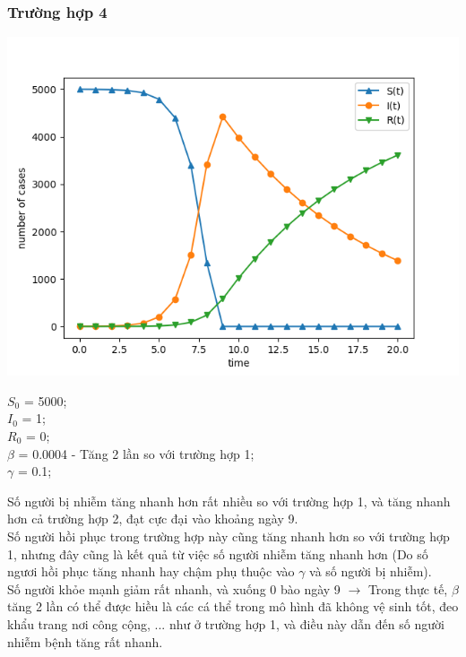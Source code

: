 \documentclass[a4paper]{article}
\begin{document}
\subsubsection{Trường hợp 4}
\begin{center}
\includegraphics{Images/5000 1 0 0_0004 0_1.png}
\end{center}
\begin{flushleft}
$S_0$ = 5000;\\
$I_0$ = 1;\\
$R_0$ = 0;\\
$\beta$ = 0.0004 - Tăng 2 lần so với trường hợp 1;\\
$\gamma$ = 0.1;\\
\end{flushleft}
Số người bị nhiễm tăng nhanh hơn rất nhiều so với trường hợp 1, và tăng nhanh hơn cả trường hợp 2, đạt cực đại vào khoảng ngày 9.\\
Số người hồi phục trong trường hợp này cũng tăng nhanh hơn so với trường hợp 1, nhưng đây cũng là kết quả từ việc số người nhiễm tăng nhanh hơn (Do số ngươi hồi phục tăng nhanh hay chậm phụ thuộc vào $\gamma$ và số người bị nhiễm).\\
Số người khỏe mạnh giảm rất nhanh, và xuống 0 bào ngày 9
$\longrightarrow$ Trong thực tế, $\beta$ tăng 2 lần có thể được hiều là các cá thể trong mô hình đã không vệ sinh tốt, đeo khẩu trang nơi công cộng, ... như ở trường hợp 1, và điều này dẫn đến số người nhiễm bệnh tăng rất nhanh.
\end{document}
